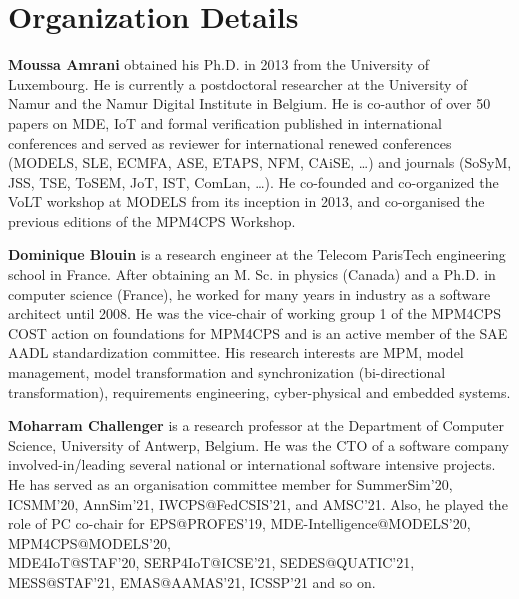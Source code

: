 \section{Organization Details}
\noindent
\textbf{Moussa Amrani} obtained his Ph.D. in 2013 from the University of Luxembourg. He is currently a postdoctoral researcher at the University of Namur and the Namur Digital Institute in Belgium. 
He is co-author of over 50 papers on MDE, IoT and formal verification published in international conferences and served as reviewer for international renewed conferences (MODELS, SLE, ECMFA, ASE, ETAPS, NFM, CAiSE, \ldots) and journals (SoSyM, JSS, TSE, ToSEM, JoT, IST, ComLan, \ldots). He co-founded and co-organized the VoLT workshop at MODELS from its inception in 2013, and co-organised
the previous editions of the MPM4CPS Workshop.

\noindent
\textbf{Dominique Blouin} is a research engineer at the Telecom ParisTech engineering school in France. 
After obtaining an M. Sc. in physics (Canada) and a Ph.D. in computer science (France), he worked for many years in industry as a software architect until 2008. He was the vice-chair of working group 1 of the MPM4CPS COST action on foundations for MPM4CPS and is an active member of the SAE AADL standardization committee. 
His research interests are MPM, model management, model transformation and synchronization (bi-directional transformation), requirements engineering, cyber-physical and embedded systems.

\noindent
\textbf{Moharram Challenger} is a research professor at the Department of Computer Science, University of Antwerp, Belgium. He was the CTO of a software company involved-in/leading several national or international software intensive projects. He has served as an organisation committee member for SummerSim'20, ICSMM'20, AnnSim'21, IWCPS@FedCSIS'21, and AMSC'21. Also, he played the role of PC co-chair for EPS@PROFES'19, MDE-Intelligence@MODELS'20, MPM4CPS@MODELS'20, \\MDE4IoT@STAF'20, SERP4IoT@ICSE'21, SEDES@QUATIC'21, MESS@STAF'21, EMAS@AAMAS'21, ICSSP'21 and so on.

